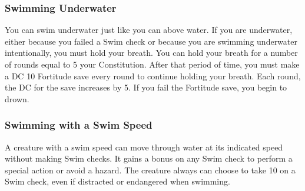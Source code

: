 \subsubsection{Swimming Underwater}
You can swim underwater just like you can above water. If you are underwater, either because you failed a Swim check or because you are swimming underwater intentionally, you must hold your breath. You can hold your breath for a number of rounds equal to 5 \add your Constitution. After that period of time, you must make a DC 10 Fortitude save every round to continue holding your breath. Each round, the DC for the save increases by 5. If you fail the Fortitude save, you begin to drown.

\subsubsection{Swimming with a Swim Speed}
A creature with a swim speed can move through water at its indicated speed without making Swim checks. It gains a  bonus on any Swim check to perform a special action or avoid a hazard. The creature always can choose to take 10 on a Swim check, even if distracted or endangered when swimming.
